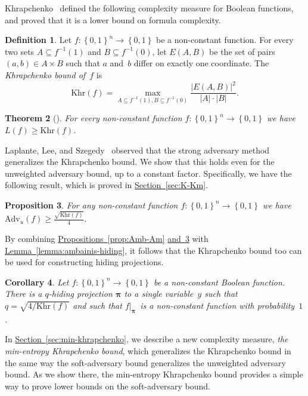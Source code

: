 \documentclass[11pt]{article}
\numberwithin{equation}{section}
\newtheorem{theorem}{Theorem}[section]
\newtheorem{proposition}[theorem]{Proposition}
\newtheorem{corollary}[theorem]{Corollary}
\theoremstyle{definition}
\newtheorem{definition}[theorem]{Definition}
\theoremstyle{plain}
\newcommand{\expref}[2]{\hyperref[#2]{#1~\ref{#2}}}
\theoremstyle{definition}\newtheorem{notation}[theorem]{Notation}\theoremstyle{plain}
\newcommand{\B}{\left\{ 0,1 \right \}}
\newcommand{\p}{\boldsymbol{\pi}}
\newcommand{\K}{\mathrm{Khr}}
\newcommand{\Amb}{\mathrm{Adv}_{u}}
\theoremstyle{definition}
\theoremstyle{plain}
\begin{document}
Khrapchenko~\cite{K72} defined the following complexity measure
for Boolean functions, and proved that it is a lower bound on formula
complexity. 
\begin{definition}
\label{def:khrapchenko}Let $f\colon\B^{n}\to\B$ be a non-constant function.
For every two sets $A\subseteq f^{-1}(1)$ and $B\subseteq f^{-1}(0)$,
let $E(A,B)$ be the set of pairs $(a,b)\in A\times B$ such that
$a$ and~$b$ differ on exactly one coordinate. The \emph{Khrapchenko
bound of~$f$} is 
\[
\K(f)=\max_{A\subseteq f^{-1}(1),B\subseteq f^{-1}(0)}\frac{\left|E(A,B)\right|^{2}}{\left|A\right|\cdot\left|B\right|}.
\]
\end{definition}

\begin{theorem}[\cite{K72}]
\label{thm:khrapchenko-formula-size}For every non-constant function
$f\colon\B^{n}\to\B$ we have $L(f)\ge\K(f)$.
\end{theorem}

Laplante, Lee, and Szegedy~\cite{LLS06} observed that the strong
adversary method generalizes the Khrapchenko bound. We show that this
holds even for the unweighted adversary bound, up to a constant factor.
Specifically, we have the following result, which is proved in \expref{Section}{sec:K-Km}.
\begin{proposition}
\label{prop:K-Amb}For any non-constant function $f\colon\B^{n}\to\B$
we have $\Amb(f)\geq\frac{\sqrt{\K(f)}}{4}$.
\end{proposition}

By combining \expref{Propositions}{prop:Amb-Am} \expref{and}{prop:K-Amb}
with \expref{Lemma}{lemma:ambainis-hiding}, it follows
that the Khrapchenko bound too can be used for constructing hiding
projections.
\begin{corollary}
\label{cor:khrapchenko-hiding}Let $f\colon\B^{n}\to\B$ be a non-constant
Boolean function. There is a $q$-hiding projection $\p$ to a single
variable~$y$ such that $q=\sqrt{4/\K(f)}$ and such that $f|_{\p}$~is
a non-constant function with probability~$1$.
\end{corollary}

In \expref{Section}{sec:min-khrapchenko}, we describe a new complexity measure,
\emph{the min-entropy Khrapchenko bound}, which generalizes the Khrapchenko
bound in the same way the soft-adversary bound generalizes the unweighted
adversary bound. As we show there, the min-entropy Khrapchenko bound
provides a simple way to prove lower bounds on the soft-adversary
bound.
\end{document}
